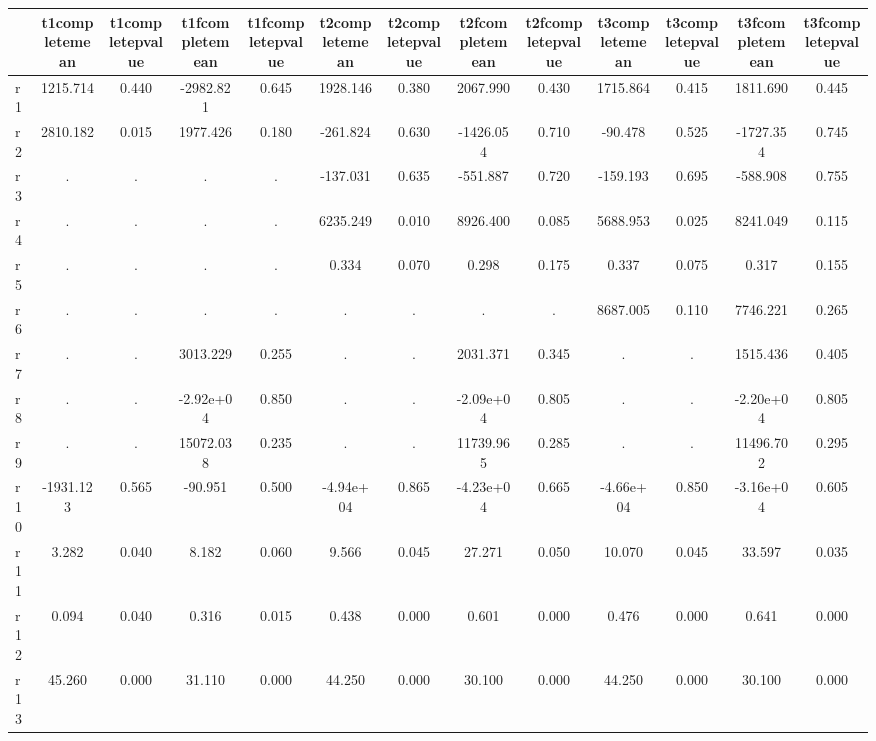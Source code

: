 \begin{table}[htbp]
\begin{tabular}{lcccccccccccc} \hline \hline
 & t1completemean  & t1completepvalue  & t1fcompletemean  & t1fcompletepvalue  & t2completemean  & t2completepvalue  & t2fcompletemean  & t2fcompletepvalue  & t3completemean  & t3completepvalue  & t3fcompletemean  & t3fcompletepvalue  \\  \hline 
r1 &  1215.714 &     0.440 & -2982.821 &     0.645 &  1928.146 &     0.380 &  2067.990 &     0.430 &  1715.864 &     0.415 &  1811.690 &     0.445 \\  
r2 &  2810.182 &     0.015 &  1977.426 &     0.180 &  -261.824 &     0.630 & -1426.054 &     0.710 &   -90.478 &     0.525 & -1727.354 &     0.745 \\  
r3 &         . &         . &         . &         . &  -137.031 &     0.635 &  -551.887 &     0.720 &  -159.193 &     0.695 &  -588.908 &     0.755 \\  
r4 &         . &         . &         . &         . &  6235.249 &     0.010 &  8926.400 &     0.085 &  5688.953 &     0.025 &  8241.049 &     0.115 \\  
r5 &         . &         . &         . &         . &     0.334 &     0.070 &     0.298 &     0.175 &     0.337 &     0.075 &     0.317 &     0.155 \\  
r6 &         . &         . &         . &         . &         . &         . &         . &         . &  8687.005 &     0.110 &  7746.221 &     0.265 \\  
r7 &         . &         . &  3013.229 &     0.255 &         . &         . &  2031.371 &     0.345 &         . &         . &  1515.436 &     0.405 \\  
r8 &         . &         . & -2.92e+04 &     0.850 &         . &         . & -2.09e+04 &     0.805 &         . &         . & -2.20e+04 &     0.805 \\  
r9 &         . &         . & 15072.038 &     0.235 &         . &         . & 11739.965 &     0.285 &         . &         . & 11496.702 &     0.295 \\  
r10 & -1931.123 &     0.565 &   -90.951 &     0.500 & -4.94e+04 &     0.865 & -4.23e+04 &     0.665 & -4.66e+04 &     0.850 & -3.16e+04 &     0.605 \\  
r11 &     3.282 &     0.040 &     8.182 &     0.060 &     9.566 &     0.045 &    27.271 &     0.050 &    10.070 &     0.045 &    33.597 &     0.035 \\  
r12 &     0.094 &     0.040 &     0.316 &     0.015 &     0.438 &     0.000 &     0.601 &     0.000 &     0.476 &     0.000 &     0.641 &     0.000 \\  
r13 &    45.260 &     0.000 &    31.110 &     0.000 &    44.250 &     0.000 &    30.100 &     0.000 &    44.250 &     0.000 &    30.100 &     0.000 \\  
\hline \hline \end{tabular}
\end{table}
